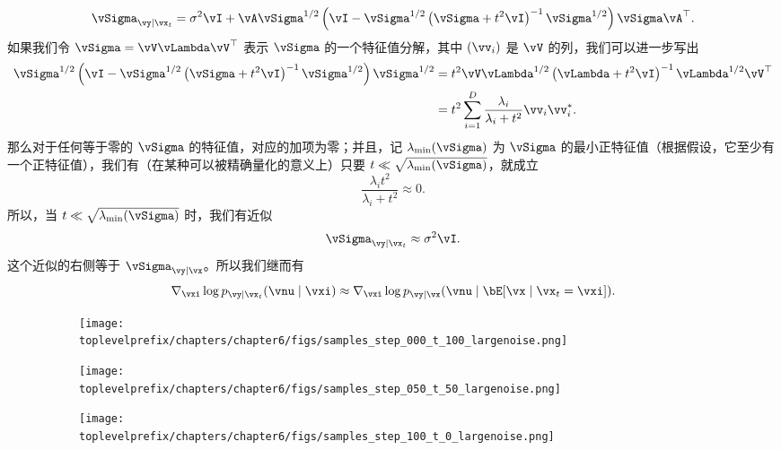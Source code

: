 \documentclass[../../book-main.tex]{subfiles}
\begin{document}
\begin{example}
  \begin{equation}
    \vSigma_{\vy \mid \vx_t}
    =
    \sigma^2 \vI + \vA\vSigma^{1/2} \left(
      \vI - \vSigma^{1/2}\left(
      \vSigma + t^2 \vI
      \right)^{-1}
      \vSigma^{1/2}
    \right)\vSigma\vA^\top.
  \end{equation}
  如果我们令 $\vSigma = \vV \vLambda \vV^\top$ 表示 $\vSigma$ 的一个特征值分解，其中 $(\vv_i)$ 是 $\vV$ 的列，我们可以进一步写出
  \begin{align}
    \vSigma^{1/2}\left(
    \vI - \vSigma^{1/2}\left(
    \vSigma + t^2 \vI
    \right)^{-1}
    \vSigma^{1/2}
    \right) \vSigma^{1/2}
    &=
    t^2 \vV \vLambda^{1/2}\left(
      \vLambda + t^2 \vI
    \right)^{-1}
    \vLambda^{1/2}
    \vV^\top
    \\
    &=
    t^2 \sum_{i=1}^D
    \frac{\lambda_i}{\lambda_i + t^2}
    \vv_i \vv_i\adj.
  \end{align}
  那么对于任何等于零的 $\vSigma$ 的特征值，对应的加项为零；并且，记 $\lambda_{\min}(\vSigma)$ 为 $\vSigma$ 的最小正特征值（根据假设，它至少有一个正特征值），我们有（在某种可以被精确量化的意义上）只要 $t \ll \sqrt{\lambda_{\min}(\vSigma)}$，就成立
  \begin{equation}
    \frac{\lambda_i t^2}{\lambda_i + t^2} \approx 0.
  \end{equation}
  所以，当 $t \ll \sqrt{\lambda_{\min}(\vSigma)}$ 时，我们有近似
  \begin{equation}
    \vSigma_{\vy \mid \vx_t} \approx \sigma^2 \vI.
  \end{equation}
  这个近似的右侧等于 $\vSigma_{\vy \mid \vx}$。所以我们继而有
  \begin{equation}
    \nabla_{\vxi} \log p_{\vy \mid \vx_t}(\vnu \mid \vxi)
    \approx
    \nabla_{\vxi} \log p_{\vy \mid \vx}(\vnu \mid \bE[\vx \mid \vx_t = \vxi]).
    \label{eq:conditional-posterior-measurementmatching-gaussian-case-dps-approx}
  \end{equation}

  \begin{figure}[tbp]
    \centering
    \begin{subfigure}{0.32\textwidth}
      \texttt{[image: \\toplevelprefix/chapters/chapter6/figs/samples\_step\_000\_t\_100\_largenoise.png]}
    \end{subfigure}
    \hfill
    \begin{subfigure}{0.32\textwidth}
      \texttt{[image: \\toplevelprefix/chapters/chapter6/figs/samples\_step\_050\_t\_50\_largenoise.png]}
    \end{subfigure}
    \hfill
    \begin{subfigure}{0.32\textwidth}
      \texttt{[image: \\toplevelprefix/chapters/chapter6/figs/samples\_step\_100\_t\_0\_largenoise.png]}
    \end{subfigure}


\end{figure}
\end{example}
\end{document}
